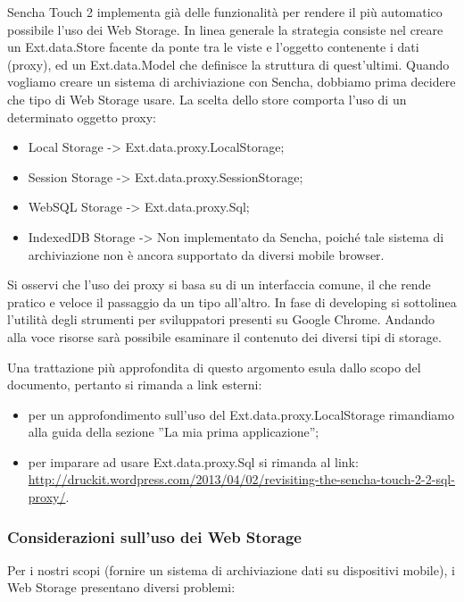 \documentclass[10pt,a4paper,onecolumn]{article}
\begin{document}
Sencha Touch 2 implementa già delle funzionalità per rendere il più automatico possibile l'uso dei Web Storage. In linea generale la strategia consiste nel creare un Ext.data.Store facente da ponte tra le viste e l'oggetto contenente i dati (proxy), ed un Ext.data.Model che definisce la struttura di quest'ultimi. Quando vogliamo creare un sistema di archiviazione con Sencha, dobbiamo prima decidere che tipo di Web Storage usare. La scelta dello store comporta l'uso di un determinato oggetto proxy:

\begin{itemize}
	\item Local Storage -> Ext.data.proxy.LocalStorage;
	\item Session Storage -> Ext.data.proxy.SessionStorage;
	\item WebSQL Storage -> Ext.data.proxy.Sql;
	\item IndexedDB Storage -> Non implementato da Sencha, poiché tale sistema di archiviazione non è ancora supportato da diversi mobile browser.
\end{itemize}

Si osservi che l'uso dei proxy si basa su di un interfaccia comune, il che rende pratico e veloce il passaggio da un tipo all'altro. In fase di developing si sottolinea l'utilità degli strumenti per sviluppatori presenti su Google Chrome. Andando alla voce risorse sarà possibile esaminare il contenuto dei diversi tipi di storage.

Una trattazione più approfondita di questo argomento esula dallo scopo del documento, pertanto si rimanda a link esterni:

\begin{itemize}
	\item per un approfondimento sull'uso del Ext.data.proxy.LocalStorage rimandiamo alla guida della sezione ''La mia prima applicazione'';
	\item per imparare ad usare Ext.data.proxy.Sql  si rimanda al link: \url{http://druckit.wordpress.com/2013/04/02/revisiting-the-sencha-touch-2-2-sql-proxy/}.
\end{itemize}

\subsubsection{Considerazioni sull'uso dei Web Storage}

Per i nostri scopi (fornire un sistema di archiviazione dati su dispositivi mobile), i Web Storage presentano diversi problemi:
\end{document}
